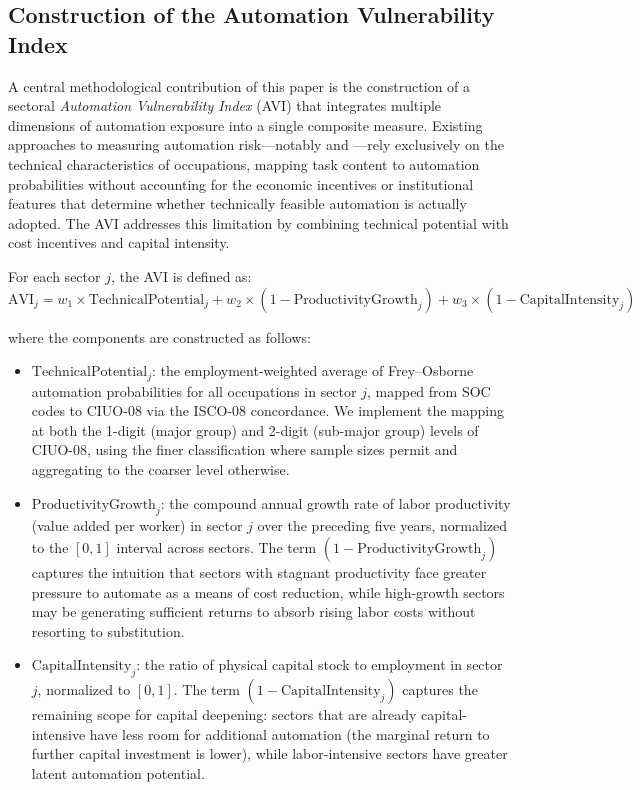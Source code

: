\documentclass{article}
\begin{document}
\subsection{Construction of the Automation Vulnerability Index}
\label{subsec:avi_construction}

A central methodological contribution of this paper is the construction of a sectoral \textit{Automation Vulnerability Index} (AVI) that integrates multiple dimensions of automation exposure into a single composite measure. Existing approaches to measuring automation risk---notably \cite{frey2017future} and \cite{morales2023risk}---rely exclusively on the technical characteristics of occupations, mapping task content to automation probabilities without accounting for the economic incentives or institutional features that determine whether technically feasible automation is actually adopted. The AVI addresses this limitation by combining technical potential with cost incentives and capital intensity.

For each sector $j$, the AVI is defined as:
\begin{equation}
\text{AVI}_j = w_1 \times \text{TechnicalPotential}_j + w_2 \times (1 - \text{ProductivityGrowth}_j) + w_3 \times (1 - \text{CapitalIntensity}_j)
\label{eq:avi}
\end{equation}

\noindent where the components are constructed as follows:

\begin{itemize}[nosep]
\item $\text{TechnicalPotential}_j$: the employment-weighted average of Frey--Osborne automation probabilities for all occupations in sector $j$, mapped from SOC codes to CIUO-08 via the ISCO-08 concordance. We implement the mapping at both the 1-digit (major group) and 2-digit (sub-major group) levels of CIUO-08, using the finer classification where sample sizes permit and aggregating to the coarser level otherwise.

\item $\text{ProductivityGrowth}_j$: the compound annual growth rate of labor productivity (value added per worker) in sector $j$ over the preceding five years, normalized to the $[0, 1]$ interval across sectors. The term $(1 - \text{ProductivityGrowth}_j)$ captures the intuition that sectors with stagnant productivity face greater pressure to automate as a means of cost reduction, while high-growth sectors may be generating sufficient returns to absorb rising labor costs without resorting to substitution.

\item $\text{CapitalIntensity}_j$: the ratio of physical capital stock to employment in sector $j$, normalized to $[0, 1]$. The term $(1 - \text{CapitalIntensity}_j)$ captures the remaining scope for capital deepening: sectors that are already capital-intensive have less room for additional automation (the marginal return to further capital investment is lower), while labor-intensive sectors have greater latent automation potential.
\end{itemize}
\end{document}

